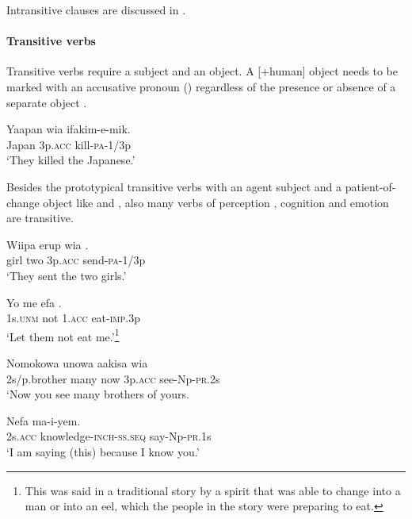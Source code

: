 Intransitive clauses are discussed in .

\paragraph{Transitive verbs}\label{sec:3.8.4.2.2}
{}
Transitive verbs require a subject and an object. A [+human] object needs to be marked with an accusative pronoun () regardless of the presence or absence of a separate object  . 

\ea%
\label{ex:3:x294}
\gll Yaapan wia ifakim-e-mik. \\
Japan 3p.\textsc{acc} kill-\textsc{pa}-1/3p \\
\glt`They killed the Japanese.'
\z

Besides the prototypical transitive verbs with an agent subject and a patient-of-change object \citep[96]{Givon1984} like  and , also many verbs of perception , cognition  and emotion  are transitive.

\ea%
\label{ex:3:x295}
\gll Wiipa erup wia . \\
girl two 3p.\textsc{acc} send-\textsc{pa}-1/3p \\
\glt`They sent the two girls.'
\z

\ea%
\label{ex:3:x296}
\gll Yo me efa . \\
1s.\textsc{unm} not 1.\textsc{acc} eat-\textsc{imp}.3p \\
\glt`Let them not eat me.'\footnote{This was said in a traditional story by a spirit that was able to change into a man or into an eel, which the people in the story were preparing to eat.}
\z

\ea%
\label{ex:3:x297}
\gll Nomokowa unowa aakisa wia  \\
2s/p.brother many now 3p.\textsc{acc} see-Np-\textsc{pr}.2s \\
\glt`Now you see many brothers of yours.
\z

\ea%
\label{ex:3:x298}
\gll Nefa  ma-i-yem. \\
2s.\textsc{acc} knowledge-\textsc{inch}-\textsc{ss}.\textsc{seq} say-Np-\textsc{pr}.1s \\
\glt`I am saying (this) because I know you.'
\z


